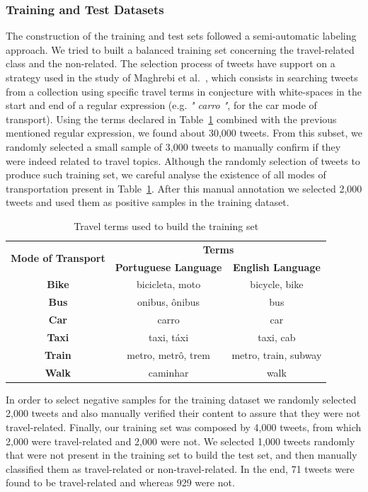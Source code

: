 \subsubsection{Training and Test Datasets}
\label{subsec:training_test_datasets_portuguese}
The construction of the training and test sets followed a semi-automatic labeling approach. We tried to built a balanced training set concerning the travel-related class and the non-related. The selection process of tweets have support on a strategy used in the study of Maghrebi et al.~\cite{maghrebi2016transportation}, which consists in searching tweets from a collection using specific travel terms in conjecture with white-spaces in the start and end of a regular expression (e.g. \emph{" carro "}, for the car mode of transport). Using the terms declared in Table~\ref{tab:terms} combined with the previous mentioned regular expression, we found about 30,000 tweets. From this subset, we randomly selected a small sample of 3,000 tweets to manually confirm if they were indeed related to travel topics. Although the randomly selection of tweets to produce such training set, we careful analyse the existence of all modes of transportation present in Table~\ref{tab:terms}. After this manual annotation we selected 2,000 tweets and used them as positive samples in the training dataset.

\begin{table}[htbp]
	\centering
	\small
	\caption{Travel terms used to build the training set}
	\label{tab:terms}
	\begin{tabular}{c|c|c}
		\hline
		\multirow{2}{*}{\textbf{Mode of Transport}} & \multicolumn{2}{c}{\textbf{Terms}} \\ \cline{2-3} 
		& \multicolumn{1}{l|}{\textbf{Portuguese Language}} & \textbf{English Language} \\ \hline
		\textbf{Bike} & bicicleta, moto & bicycle, bike \\
		\textbf{Bus} & onibus, ônibus & bus \\
		\textbf{Car} & carro & car \\
		\textbf{Taxi} & taxi, táxi & taxi, cab \\
		\textbf{Train} & metro, metrô, trem & metro, train, subway \\
		\textbf{Walk} & caminhar & walk \\ \hline
	\end{tabular}
\end{table}

In order to select negative samples for the training dataset we randomly selected 2,000 tweets and also manually verified their content to assure that they were not travel-related. Finally, our training set was composed by 4,000 tweets, from which 2,000 were travel-related and 2,000 were not. 
We selected 1,000 tweets randomly that were not present in the training set to build the test set, and then manually classified them as travel-related or non-travel-related. In the end, 71 tweets were found to be travel-related and whereas 929 were not.

